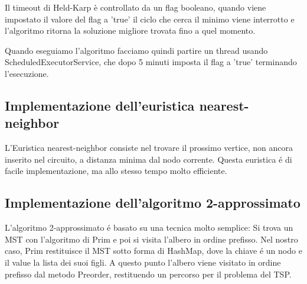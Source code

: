 Il timeout di Held-Karp è controllato da un flag booleano, quando viene impostato il valore del flag a 'true' il ciclo che cerca il minimo viene interrotto e l'algoritmo ritorna la soluzione migliore trovata fino a quel momento.

Quando eseguiamo l'algoritmo facciamo quindi partire un thread usando ScheduledExecutorService, che dopo 5 minuti imposta il flag a 'true' terminando l'esecuzione.

\subsection{Implementazione dell'euristica nearest-neighbor}
L'Euristica nearest-neighbor consiste nel trovare il prossimo vertice, non ancora inserito nel circuito, a distanza minima dal nodo corrente. Questa euristica \'e
di facile implementazione, ma allo stesso tempo molto efficiente.

\subsection{Implementazione dell'algoritmo 2-approssimato}
L'algoritmo 2-approssimato \'e basato su una tecnica molto semplice: Si trova un MST con l'algoritmo di Prim e poi si visita l'albero in ordine prefisso.
Nel nostro caso, Prim restituisce il MST sotto forma di HashMap, dove la chiave \'e un nodo e il value la lista dei suoi figli. A questo punto l'albero viene visitato in ordine
prefisso dal metodo Preorder, restituendo un percorso per il problema del TSP.